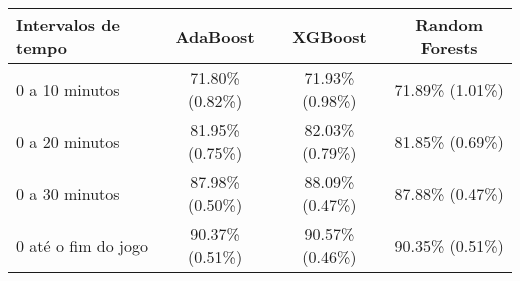 \documentclass[  
convert={
    size=4000x2000,
    outext=.png
  },
]{standalone}
\begin{document}
\begin{tabular}{lccc} %
\toprule
Intervalos de tempo & AdaBoost & XGBoost & Random Forests\\
\midrule
\rowcolor{black!20} 0 a 10 minutos & 71.80\% (0.82\%) & 71.93\% (0.98\%) & 71.89\% (1.01\%)\\
0 a 20 minutos & 81.95\% (0.75\%) & 82.03\% (0.79\%) & 81.85\% (0.69\%)\\
\rowcolor{black!20} 0 a 30 minutos & 87.98\% (0.50\%) & 88.09\% (0.47\%) & 87.88\% (0.47\%)\\
0 até o fim do jogo & 90.37\% (0.51\%) & 90.57\% (0.46\%) & 90.35\% (0.51\%)\\
\midrule[\heavyrulewidth]
\end{tabular}
\end{document}
